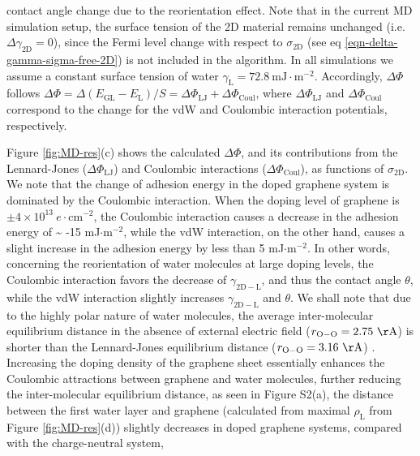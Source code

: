 \documentclass[journal=ancac3,manuscript=article,email=true,hyperref=true,keywords=true]{achemso}
\begin{document}
contact angle change due to the reorientation effect. Note that in the
current MD simulation setup, the surface tension of the 2D material
remains unchanged (i.e. \(\Delta \gamma_{\mathrm{2D}}=0\)), since the
Fermi level change with
respect to \(\sigma_{\mathrm{2D}}\) (see eq
\ref{eqn-delta-gamma-sigma-free-2D}) is not included in the algorithm. In all simulations we assume a
constant surface tension of water \(\gamma_{\mathrm{L}}=72.8\
\mathrm{mJ}\cdot \mathrm{m}^{-2}\). Accordingly, \(\Delta \Phi\) follows
\(\Delta \Phi = \Delta (E_{\mathrm{GL}} - E_{\mathrm{L}})/S = \Delta
\Phi_{\mathrm{LJ}} + \Delta \Phi_{\mathrm{Coul}}\), where \(\Delta
\Phi_{\mathrm{LJ}}\) and \(\Delta \Phi_{\mathrm{Coul}}\) correspond to
the change for the vdW and Coulombic interaction potentials,
respectively.


Figure \ref{fig:MD-res}(c) shows the calculated \(\Delta \Phi\), and
its contributions from the Lennard-Jones (\(\Delta \Phi_{\mathrm{LJ}}\))
and Coulombic interactions (\(\Delta \Phi_{\mathrm{Coul}}\)), as
functions of \(\sigma_{\mathrm{2D}}\). We note that the change of
adhesion energy in the doped graphene system is dominated by the
Coulombic interaction. When the doping level of graphene is \(\pm 4
\times 10^{13}\ e\cdot \mathrm{cm}^{-2}\), the Coulombic interaction
causes a decrease in the adhesion energy of \textasciitilde{} -15 mJ\(\cdot
\mathrm{m}^{-2}\), while the vdW interaction, on the other hand, causes
a slight increase in the adhesion energy by less than 5 mJ\(\cdot
\mathrm{m}^{-2}\). In other words, concerning the reorientation of
water molecules at large doping levels, the Coulombic interaction
favors the decrease of \(\gamma_{\mathrm{2D-L}}\), and thus the contact
angle \(\theta\), while the vdW interaction slightly increases
\(\gamma_{\mathrm{2D-L}}\) and \(\theta\). We shall note that due to the
highly polar nature of water molecules, the average inter-molecular
equilibrium distance in the absence of external electric field
(\(r_{\mathrm{O-O}}=2.75\ \mathrm{\AA}\)) is shorter than the
Lennard-Jones equilibrium distance (\(r_{\mathrm{O-O}}=3.16\
\mathrm{\AA}\)) \cite{Mark_2001}. Increasing the doping density of the
graphene sheet essentially enhances the Coulombic attractions between
graphene and water molecules, further reducing the inter-molecular
equilibrium distance, as seen in Figure S2(a), the distance between
the first water layer and graphene (calculated from maximal
\(\rho_{\mathrm{L}}\) from Figure \ref{fig:MD-res}(d)) slightly decreases
in doped graphene systems, compared with the charge-neutral system,
\end{document}
